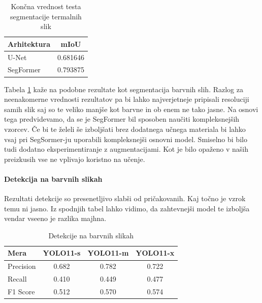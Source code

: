 \documentclass[10pt,twocolumn,letterpaper]{article}
\begin{document}
\begin{table}[h!]
    \begin{center}
        \begin{tabular}{|l|c|}
            \hline
                Arhitektura & mIoU \\
            \hline\hline
                U-Net & 0.681646 \\
                SegFormer & 0.793875 \\
            \hline
        \end{tabular}
    \end{center}
    \caption{Končna vrednost testa segmentacije termalnih slik}
    \label{tab:rezultati_segmentacije_thermal}
\end{table}

Tabela \ref{tab:rezultati_segmentacije_thermal} kaže na podobne rezultate kot segmentacija barvnih slih. Razlog za neenakomerne vrednosti rezultatov pa bi lahko najverjetneje pripisali resoluciji samih slik saj so te veliko manjše kot barvne in ob enem ne tako jasne. Na osnovi tega predvidevamo, da se je SegFormer bil sposoben naučiti kompleksnejših vzorcev. Če bi te želeli še izboljšati brez dodatnega učnega materiala bi lahko vsaj pri SegSormer-ju uporabili kompleksnejši osnovni model. Smiselno bi bilo tudi dodatno eksperimentiranje z augmentacijami. Kot je bilo opaženo v naših preizkusih vse ne vplivajo koristno na učenje.

\paragraph{Detekcija na barvnih slikah\newline}
Rezultati detekcije so presenetljivo slabši od pričakovanih. Kaj točno je vzrok temu ni jasno. Iz spodnjih tabel lahko vidimo, da zahtevnejši model te izboljša vendar vseeno je razlika majhna.

\begin{table}[h!]
    \begin{center}
        \begin{tabular}{|l|c|c|c|}
            \hline
                Mera & YOLO11-s & YOLO11-m & YOLO11-x \\
            \hline\hline
                Precision & 0.682 & 0.782 & 0.722 \\
                Recall & 0.410 & 0.449 & 0.477 \\
                F1 Score & 0.512 & 0.570 & 0.574 \\
            \hline
        \end{tabular}
    \end{center}
    \caption{Detekcije na barvnih slikah}
    \label{tab:rezultati_detekcija_cela_rgb}
\end{table}
\end{document}
